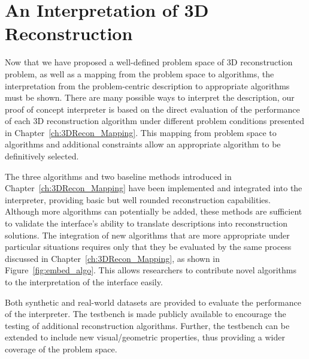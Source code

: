 
\chapter{An Interpretation of 3D Reconstruction}
\label{ch:3DRecon_Interp}
Now that we have proposed a well-defined problem space of 3D reconstruction problem, as well as a mapping from the problem space to algorithms, the interpretation from the problem-centric description to appropriate algorithms must be shown. There are many possible ways to interpret the description, our proof of concept interpreter is based on the direct evaluation of the performance of each 3D reconstruction algorithm under different problem conditions presented in Chapter~\ref{ch:3DRecon_Mapping}. This mapping from problem space to algorithms and additional constraints allow an appropriate algorithm to be definitively selected.

The three algorithms and two baseline methods introduced in Chapter~\ref{ch:3DRecon_Mapping} have been implemented and integrated into the interpreter, providing basic but well rounded reconstruction capabilities. Although more algorithms can potentially be added, these methods are sufficient to validate the interface's ability to translate descriptions into reconstruction solutions. The integration of new algorithms that are more appropriate under particular situations requires only that they be evaluated by the same process discussed in Chapter~\ref{ch:3DRecon_Mapping}, as shown in Figure~\ref{fig:embed_algo}. This allows researchers to contribute novel algorithms to the interpretation of the interface easily. 

Both synthetic and real-world datasets are provided to evaluate the performance of the interpreter. The testbench is made publicly available to encourage the testing of additional reconstruction algorithms. Further, the testbench can be extended to include new visual/geometric properties, thus providing a wider coverage of the problem space.


